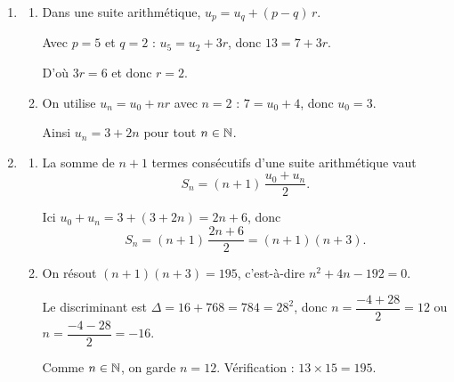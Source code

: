 \begin{enumerate}
  \item
  \begin{enumerate}
    \item Dans une suite arithmétique, $u_p = u_q + (p-q)\,r$.

    Avec $p = 5$ et $q = 2$ : $u_5 = u_2 + 3r$, donc $13 = 7 + 3r$.

    D'où $3r = 6$ et donc $r = 2$.
    \item On utilise $u_n = u_0 + n r$ avec $n = 2$ : $7 = u_0 + 4$, donc $u_0 = 3$.

    Ainsi $u_n = 3 + 2n$ pour tout $n \in \mathbb{N}$.
  \end{enumerate}
  \item
  \begin{enumerate}
    \item La somme de $n+1$ termes consécutifs d'une suite arithmétique vaut
    $$S_n = (n+1)\,\frac{u_0 + u_n}{2}.$$

    Ici $u_0 + u_n = 3 + (3 + 2n) = 2n + 6$, donc
    $$S_n = (n+1)\,\frac{2n+6}{2} = (n+1)(n+3).$$
    \item On résout $(n+1)(n+3) = 195$, c'est-à-dire $n^2 + 4n - 192 = 0$.

    Le discriminant est $\Delta = 16 + 768 = 784 = 28^2$, donc $n = \dfrac{-4 + 28}{2} = 12$ ou $n = \dfrac{-4-28}{2} = -16$.

    Comme $n \in \mathbb{N}$, on garde $n = 12$. Vérification : $13 \times 15 = 195$.
  \end{enumerate}
\end{enumerate}

\begin{center}
\end{center}
